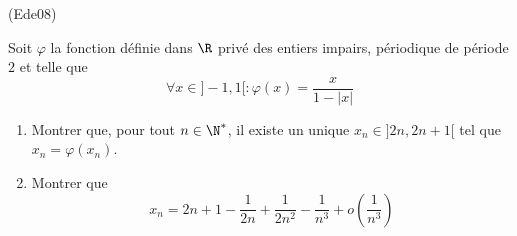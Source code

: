 \begin{tiny}(Ede08)\end{tiny} Soit $\varphi$ la fonction définie dans $\R$ privé des entiers impairs, périodique de période $2$ et telle que
\begin{displaymath}
 \forall x\in ]-1,1[: \varphi(x) = \frac{x}{1-|x|}
\end{displaymath}
\begin{enumerate}
 \item Montrer que, pour tout $n\in \N^*$, il existe un unique $x_n\in ]2n,2n+1[$ tel que $x_n=\varphi(x_n)$.
 \item Montrer que
\begin{displaymath}
 x_n = 2n+1-\frac{1}{2n}+\frac{1}{2n^2}-\frac{1}{n^3}+o(\frac{1}{n^3})
\end{displaymath}

\end{enumerate}
